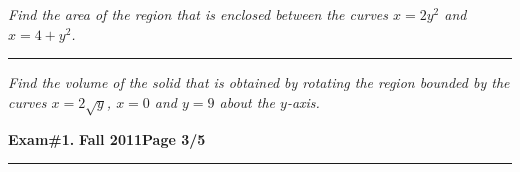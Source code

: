 \documentclass[12pt]{article}
\begin{document}
\bigskip
{\problem[10 pts] \em  Find the area of the region that is enclosed between the
curves $x=2y^2$ and $x=4+y^2$.} 
\vspace{8.5cm}
\begin{flushright}
\end{flushright}
\hrule
{\problem[15 pts] \em Find the volume of the solid that is obtained by rotating
the region bounded by the curves $x=2\sqrt{y}$, $x=0$ and $y=9$ about the
$y$-axis.} \vspace{8.5cm}
\begin{flushright}
\end{flushright}
\newpage

\hfill{\large\bf Exam\#1.}\hfill{\large\bf
  Fall 2011}\hfill{\large\bf Page 3/5}\hrule
\end{document}
